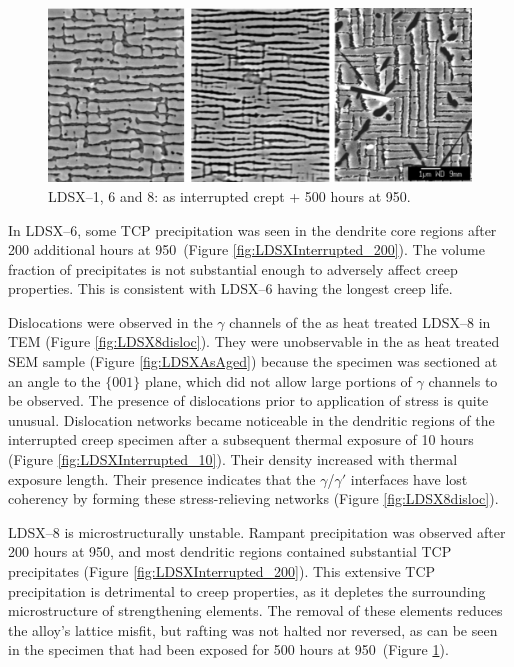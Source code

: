 %
\begin{figure}[hp]
\begin{center}
\includegraphics{LDSXInterrupted_500}
\caption{LDSX--1, 6 and 8: as interrupted crept + 500 hours at 950\celsius.}\label{fig:LDSXInterrupted_500}
\end{center}
\end{figure}
%
In LDSX--6, some TCP precipitation was seen in the dendrite core regions after 200 additional hours at 950\celsius\ (Figure \ref{fig:LDSXInterrupted_200}).  The volume fraction of precipitates is not substantial enough to adversely affect creep properties.  This is consistent with LDSX--6 having the longest creep life.  

Dislocations were observed in the $\gamma$ channels of the as heat treated LDSX--8 in TEM (Figure \ref{fig:LDSX8disloc}). They were unobservable in the as heat treated SEM sample (Figure \ref{fig:LDSXAsAged}) because the specimen was sectioned at an angle to the $\{001\}$ plane, which did not allow large portions of $\gamma$ channels to be observed.  The presence of dislocations prior to application of stress is quite unusual.  Dislocation networks became noticeable in the dendritic regions of the interrupted creep specimen after a subsequent thermal exposure of 10 hours (Figure \ref{fig:LDSXInterrupted_10}).  Their density increased with thermal exposure length.  Their presence indicates that the $\gamma$/$\gamma'$ interfaces have lost coherency by forming these stress-relieving networks (Figure \ref{fig:LDSX8disloc}).  

LDSX--8 is microstructurally unstable.  Rampant precipitation was observed after 200 hours at 950\celsius, and most dendritic regions contained substantial TCP precipitates (Figure \ref{fig:LDSXInterrupted_200}).  This extensive TCP precipitation is detrimental to creep properties, as it depletes the surrounding microstructure of strengthening elements.  The removal of these elements reduces the alloy's lattice misfit, but rafting was not halted nor reversed, as can be seen in the specimen that had been exposed for 500 hours at 950\celsius\ (Figure \ref{fig:LDSXInterrupted_500}). 

